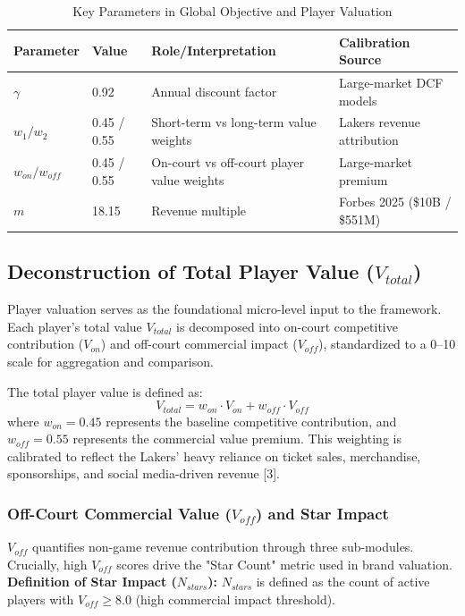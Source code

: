 \documentclass[12pt]{article}
\begin{document}
\begin{table}[H]
\centering
\caption{Key Parameters in Global Objective and Player Valuation}
\begin{tabular}{llll}
\toprule
\textbf{Parameter} & \textbf{Value} & \textbf{Role/Interpretation} & \textbf{Calibration Source} \\
\midrule
$\gamma$ & 0.92 & Annual discount factor & Large-market DCF models \\
$w_1 / w_2$ & 0.45 / 0.55 & Short-term vs long-term value weights & Lakers revenue attribution \\
$w_{on} / w_{off}$ & 0.45 / 0.55 & On-court vs off-court player value weights & Large-market premium \\
$m$ & 18.15 & Revenue multiple & Forbes 2025 (\$10B / \$551M) \\
\bottomrule
\end{tabular}
\end{table}

\subsection{Deconstruction of Total Player Value ($V_{total}$)}
Player valuation serves as the foundational micro-level input to the framework. Each player's total value $V_{total}$ is decomposed into on-court competitive contribution ($V_{on}$) and off-court commercial impact ($V_{off}$), standardized to a 0–10 scale for aggregation and comparison.

The total player value is defined as:
\begin{equation}
V_{total} = w_{on} \cdot V_{on} + w_{off} \cdot V_{off}
\end{equation}
where $w_{on} = 0.45$ represents the baseline competitive contribution, and $w_{off} = 0.55$ represents the commercial value premium. This weighting is calibrated to reflect the Lakers' heavy reliance on ticket sales, merchandise, sponsorships, and social media-driven revenue [3].

\subsubsection{Off-Court Commercial Value ($V_{off}$) and Star Impact}
$V_{off}$ quantifies non-game revenue contribution through three sub-modules. Crucially, high $V_{off}$ scores drive the "Star Count" metric used in brand valuation.
\textbf{Definition of Star Impact ($N_{stars}$):} $N_{stars}$ is defined as the count of active players with $V_{off} \ge 8.0$ (high commercial impact threshold).
\end{document}
